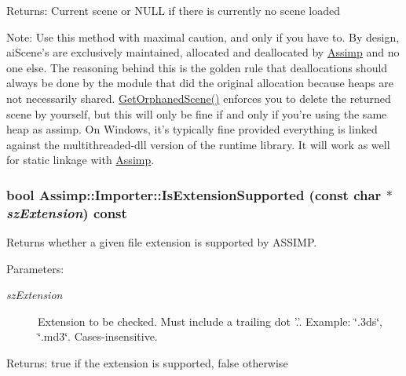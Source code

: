 \begin{Desc}
\item[Returns:]Current scene or NULL if there is currently no scene loaded \end{Desc}
\begin{Desc}
\item[Note:]Use this method with maximal caution, and only if you have to. By design, aiScene's are exclusively maintained, allocated and deallocated by \hyperlink{namespace_assimp}{Assimp} and no one else. The reasoning behind this is the golden rule that deallocations should always be done by the module that did the original allocation because heaps are not necessarily shared. \hyperlink{class_assimp_1_1_importer_60eb9042fb85bfbd61a863e131a56ecd}{GetOrphanedScene()} enforces you to delete the returned scene by yourself, but this will only be fine if and only if you're using the same heap as assimp. On Windows, it's typically fine provided everything is linked against the multithreaded-dll version of the runtime library. It will work as well for static linkage with \hyperlink{namespace_assimp}{Assimp}. \end{Desc}
\hypertarget{class_assimp_1_1_importer_9146ea75c33c0aac0310195346877388}{
\subsubsection[IsExtensionSupported]{\setlength{\rightskip}{0pt plus 5cm}bool Assimp::Importer::IsExtensionSupported (const char $\ast$ {\em szExtension}) const}}
\label{class_assimp_1_1_importer_9146ea75c33c0aac0310195346877388}


Returns whether a given file extension is supported by ASSIMP.

\begin{Desc}
\item[Parameters:]
\begin{description}
\item[{\em szExtension}]Extension to be checked. Must include a trailing dot '.'. Example: \char`\"{}.3ds\char`\"{}, \char`\"{}.md3\char`\"{}. Cases-insensitive. \end{description}
\end{Desc}
\begin{Desc}
\item[Returns:]true if the extension is supported, false otherwise \end{Desc}


